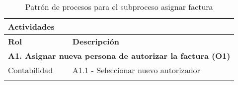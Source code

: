\begin{longtable}{|llrrrrrr|}
	
	\multicolumn{8}{|l|}{\textbf{Actividades}} \\ \hline
    \textbf{Rol} & \multicolumn{7}{|l|}{\textbf{Descripción}} \\ \hline 
    \multicolumn{8}{|l|}{\textbf{A1. Asignar nueva persona de autorizar la factura (O1) }} \\ \hline
    Contabilidad & \multicolumn{7}{|m{12cm}|}{A1.1 - Seleccionar nuevo autorizador} \\ \hline
     
    \caption{Patrón de procesos para el subproceso asignar factura}
\end{longtable}